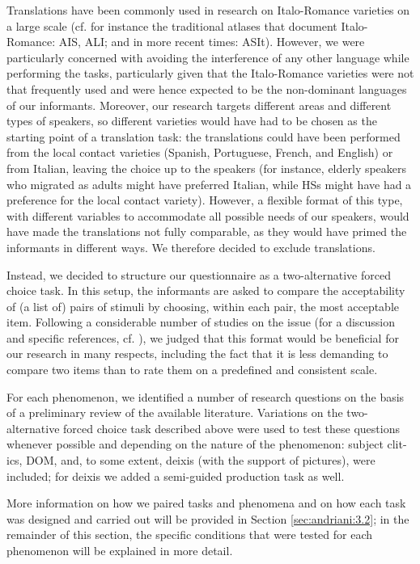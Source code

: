 \documentclass[output=paper,hidelinks]{langscibook}
\begin{document}
Translations have been commonly used in research on Italo-Romance varieties on a large scale (cf. for instance the traditional atlases that document Italo-Romance: AIS, ALI; and in more recent times: ASIt). However, we were particularly concerned with avoiding the interference of any other language while performing the tasks, particularly given that the Italo-Romance varieties were not that frequently used and were hence expected to be the non-dominant languages of our informants. Moreover, our research targets different areas and different types of speakers, so different varieties would have had to be chosen as the starting point of a translation task: the translations could have been performed from the local contact varieties (Spanish, Portuguese, French, and English) or from Italian, leaving the choice up to the speakers (for instance, elderly speakers who migrated as adults might have preferred Italian, while HSs might have had a preference for the local contact variety). However, a flexible format of this type, with different variables to accommodate all possible needs of our speakers, would have made the translations not fully comparable, as they would have primed the informants in different ways. We therefore decided to exclude translations.

Instead, we decided to structure our questionnaire as a two-alternative forced choice task. In this setup, the informants are asked to compare the acceptability of (a list of) pairs of stimuli by choosing, within each pair, the most acceptable item. Following a considerable number of studies on the issue (for a discussion and specific references, cf. \citealt{StadthagenGonzlezEtAl2018}), we judged that this format would be beneficial for our research in many respects, including the fact that it is less demanding to compare two items than to rate them on a predefined and consistent scale. 

For each phenomenon, we identified a number of research questions on the basis of a preliminary review of the available literature. Variations on the two-alternative forced choice task described above were used to test these questions whenever possible and depending on the nature of the phenomenon: subject clit-ics, DOM, and, to some extent, deixis (with the support of pictures), were included; for deixis we added a semi-guided production task as well. 

More information on how we paired tasks and phenomena and on how each task was designed and carried out will be provided in Section \ref{sec:andriani:3.2}; in the remainder of this section, the specific conditions that were tested for each phenomenon will be explained in more detail.
\end{document}
